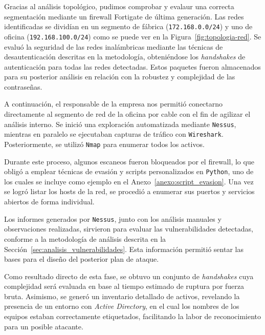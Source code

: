 \documentclass[a4paper, 11pt]{article}
\begin{document}
Gracias al análisis topológico, pudimos comprobar y evalaur una correcta segmentación mediante un firewall Fortigate de última generación. Las redes identificadas se dividían en un segmento de fábrica (\texttt{172.168.0.0/24}) y uno de oficina (\texttt{192.168.100.0/24}) como se puede ver en la Figura~\ref{fig:topologia-red}. Se evaluó la seguridad de las redes inalámbricas mediante las técnicas de desautenticación descritas en la metodología, obteniéndose los \textit{handshakes} de autenticación para todas las redes detectadas. Estos paquetes fueron almacenados para su posterior análisis en relación con la robustez y complejidad de las contraseñas.



A continuación, el responsable de la empresa nos permitió conectarno directamente al segmento de red de la oficina por cable con el fin de agilizar el análisis interno. Se inició una exploración automatizada mediante \texttt{Nessus}, mientras en paralelo se ejecutaban capturas de tráfico con \texttt{Wireshark}. Posteriormente, se utilizó \texttt{Nmap} para enumerar todos los activos.



Durante este proceso, algunos escaneos fueron bloqueados por el firewall, lo que obligó a emplear técnicas de evasión y scripts personalizados en \texttt{Python}, uno de los cuales se incluye como ejemplo en el Anexo~\ref{anexo:script_evasion}. Una vez se logró listar los hosts de la red, se procedió a enumerar sus puertos y servicios abiertos de forma individual.



Los informes generados por \texttt{Nessus}, junto con los análisis manuales y observaciones realizadas, sirvieron para evaluar las vulnerabilidades detectadas, conforme a la metodología de análisis descrita en la Sección~\ref{sec:analisis_vulnerabilidades}. Esta información permitió sentar las bases para el diseño del posterior plan de ataque.



Como resultado directo de esta fase, se obtuvo un conjunto de \textit{handshakes} cuya complejidad será evaluada en base al tiempo estimado de ruptura por fuerza bruta. Asimismo, se generó un inventario detallado de activos, revelando la presencia de un entorno con \textit{Active Directory}, en el cual los nombres de los equipos estaban correctamente etiquetados, facilitando la labor de reconocimiento para un posible atacante.
\end{document}
